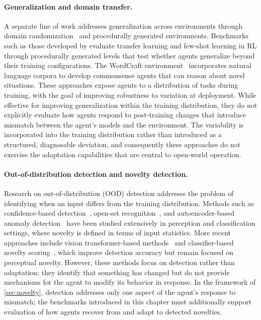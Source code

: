 \paragraph{Generalization and domain transfer.}
A separate line of work addresses generalization across environments through domain randomization~\citep{tobin2017domain,peng2018sim} and procedurally generated environments. Benchmarks such as those developed by \citet{nichol2018gotta} evaluate transfer learning and few-shot learning in RL through procedurally generated levels that test whether agents generalize beyond their training configurations. The WordCraft environment~\citep{jiang2020wordcraft} incorporates natural language corpora to develop commonsense agents that can reason about novel situations. These approaches expose agents to a distribution of tasks during training, with the goal of improving robustness to variation at deployment. While effective for improving generalization within the training distribution, they do not explicitly evaluate how agents respond to post-training changes that introduce mismatch between the agent's models and the environment. The variability is incorporated into the training distribution rather than introduced as a structured, diagnosable deviation, and consequently these approaches do not exercise the adaptation capabilities that are central to open-world operation.

\paragraph{Out-of-distribution detection and novelty detection.}
Research on out-of-distribution (OOD) detection addresses the problem of identifying when an input differs from the training distribution. Methods such as confidence-based detection~\citep{hendrycks2017baseline}, open-set recognition~\citep{scheirer2013toward,bendale2016towards}, and autoencoder-based anomaly detection~\citep{abati2019autoregression} have been studied extensively in perception and classification settings, where novelty is defined in terms of input statistics. More recent approaches include vision transformer-based methods~\citep{lee2022anovit} and classifier-based novelty scoring~\citep{cheng2021learning}, which improve detection accuracy but remain focused on perceptual novelty. However, these methods focus on detection rather than adaptation: they identify that something has changed but do not provide mechanisms for the agent to modify its behavior in response. In the framework of \cref{sec:novelty}, detection addresses only one aspect of the agent's response to mismatch; the benchmarks introduced in this chapter must additionally support evaluation of how agents recover from and adapt to detected novelties.

